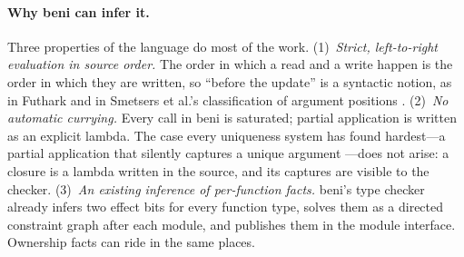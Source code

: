 \paragraph{Why beni can infer it.}
Three properties of the language do most of the work.
(1)~\emph{Strict, left-to-right evaluation in source order.} The order in which a read and a write
happen is the order in which they are written, so ``before the update'' is a syntactic notion, as
in Futhark and in Smetsers et al.'s classification of argument positions
\citep{smetsers1994guaranteeing}.
(2)~\emph{No automatic currying.} Every call in beni is saturated; partial application is written
as an explicit lambda. The case every uniqueness system has found hardest---a partial application
that silently captures a unique argument
\citep{barendsen1996uniqueness,devries2008simplified,lorenzen2024oxidizing}---does not arise: a
closure is a lambda written in the source, and its captures are visible to the checker.
(3)~\emph{An existing inference of per-function facts.} beni's type checker already infers two
effect bits for every function type, solves them as a directed constraint graph after each module,
and publishes them in the module interface. Ownership facts can ride in the same places.

